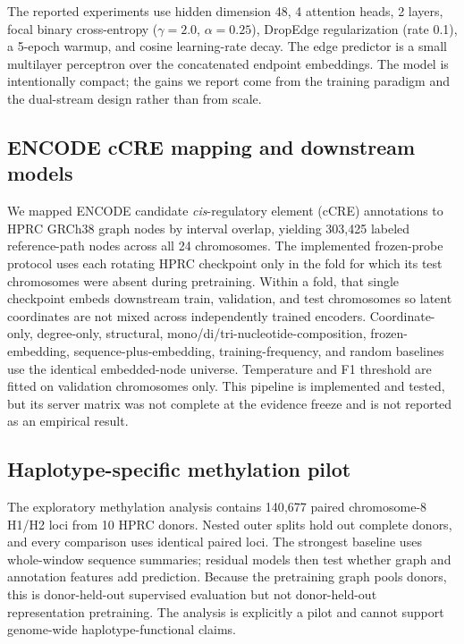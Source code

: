 \IfFileExists{ws-procs11x85.cls}{\worldscientificclasstrue\documentclass{ws-procs11x85}}{\worldscientificclassfalse\documentclass[11pt]{article}\usepackage[margin=1in]{geometry}}
\begin{document}
The reported experiments use hidden dimension 48, 4 attention heads, 2 layers,
focal binary cross-entropy ($\gamma=2.0$, $\alpha=0.25$), DropEdge regularization
(rate 0.1), a 5-epoch warmup, and cosine learning-rate decay. The edge predictor
is a small multilayer perceptron over the concatenated endpoint embeddings. The
model is intentionally compact; the gains we report come from the training
paradigm and the dual-stream design rather than from scale.

\subsection{ENCODE cCRE mapping and downstream models}

We mapped ENCODE candidate \emph{cis}-regulatory element (cCRE)
annotations\cite{encode2012,moore2020encode} to HPRC GRCh38 graph nodes by
interval overlap, yielding 303{,}425 labeled reference-path nodes across all 24
chromosomes. The implemented frozen-probe protocol uses each rotating HPRC
checkpoint only in the fold for which its test chromosomes were absent during
pretraining. Within a fold, that single checkpoint embeds downstream train,
validation, and test chromosomes so latent coordinates are not mixed across
independently trained encoders. Coordinate-only, degree-only, structural,
mono/di/tri-nucleotide-composition, frozen-embedding, sequence-plus-embedding,
training-frequency, and random baselines use the identical embedded-node
universe. Temperature and F1 threshold are fitted on validation chromosomes
only. This pipeline is implemented and tested, but its server matrix was not
complete at the evidence freeze and is not reported as an empirical result.

\subsection{Haplotype-specific methylation pilot}
\label{sec:haplotype-methods}

The exploratory methylation analysis contains 140{,}677 paired chromosome-8
H1/H2 loci from 10 HPRC donors. Nested outer splits hold out complete donors,
and every comparison uses identical paired loci. The strongest baseline uses
whole-window sequence summaries; residual models then test whether graph and
annotation features add prediction. Because the pretraining graph pools donors,
this is donor-held-out supervised evaluation but not donor-held-out
representation pretraining. The analysis is explicitly a pilot and cannot
support genome-wide haplotype-functional claims.
\end{document}
